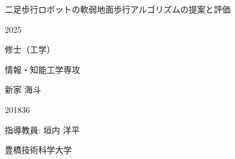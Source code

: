 \documentclass[uplatex, a4paper, 12pt]{jsbook}
\newcommand{\thesistitle}{二足歩行ロボットの軟弱地面歩行アルゴリズムの提案と評価}
\newcommand{\thesisyear}{2025}                %
\newcommand{\thesisdegree}{修士（工学）}       %
\newcommand{\major}{情報・知能工学専攻}        %
\newcommand{\authorname}{新家 海斗}            %
\newcommand{\studentid}{201836}               %
\newcommand{\advisor}{指導教員: 垣内 洋平}     %
\newcommand{\university}{豊橋技術科学大学}      %
\begin{document}
\begin{titlepage}
  \thispagestyle{empty}
  \begin{center}
    \vspace*{40mm}

    {\LARGE
      \parbox{0.9\linewidth}{\centering \thesistitle}\par
    }

    \vspace{20mm}

    {\Large \thesisyear \par}
    \vspace{5mm}

    {\Large \thesisdegree \par}
    \vspace{5mm}

    {\Large \major \par}
    \vspace{15mm}

    {\Large \authorname \par}
    \vspace{3mm}

    {\Large \studentid \par}
    \vspace{10mm}

    {\Large \advisor \par}
    \vspace{15mm}

    {\Large \university \par}

  \end{center}
\end{titlepage}

\clearpage

\frontmatter{}


\mainmatter{}









\backmatter{}

\end{document}
